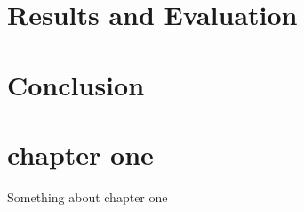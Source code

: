 \documentclass[12pt, a4paper]{report}
\newcommand\blankpage{%
    \null
    \thispagestyle{empty}%
    \newpage}
\begin{document}
\graphicspath{{./references/images/}}
\VerbatimFootnotes

\pagestyle{empty}






\afterpage{\blankpage}

\tableofcontents
\thispagestyle{empty}


\newpage

\listoffigures
\thispagestyle{empty}


\newpage

\listoftables
\thispagestyle{empty}


\newpage

\listofalgorithms
\thispagestyle{empty}


\newpage

\pagestyle{fancy}
\fancyhead[R]{\thepage}
\fancyfoot{}











\chapter{Results and Evaluation}

\chapter{Conclusion}


\newpage


\nocite{*}


\appendix
\chapter{chapter one}

Something about chapter one
\end{document}
